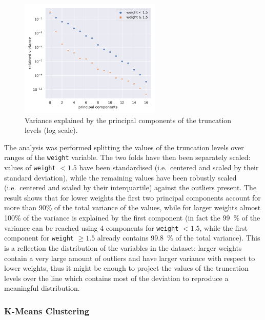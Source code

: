 \begin{figure}[htbp]
  \centering
  \includegraphics[width=0.6\textwidth]{img/svd}
  \caption{Variance explained by the principal components of the truncation levels (log scale).}
  \label{fig:lumps:svd}
\end{figure}

The analysis was performed splitting the values of the truncation levels over ranges of the \texttt{weight} variable.
The two folds have then been separately scaled: values of \texttt{weight} $< 1.5$ have been standardised (i.e.\ centered and scaled by their standard deviation), while the remaining values have been robustly scaled (i.e.\ centered and scaled by their interquartile) against the outliers present.
The result shows that for lower weights the first two principal components account for more than 90\% of the total variance of the values, while for larger weights almost 100\% of the variance is explained by the first component (in fact the \SI{99}{\percent} of the variance can be reached using 4 components for \texttt{weight} $< 1.5$, while the first component for \texttt{weight} $\ge 1.5$ already contains \SI{99.8}{\percent} of the total variance).
This is a reflection the distribution of the variables in the dataset: larger weights contain a very large amount of outliers and have larger variance with respect to lower weights, thus it might be enough to project the values of the truncation levels over the line which contains most of the deviation to reproduce a meaningful distribution.


\subsubsection{K-Means Clustering}

